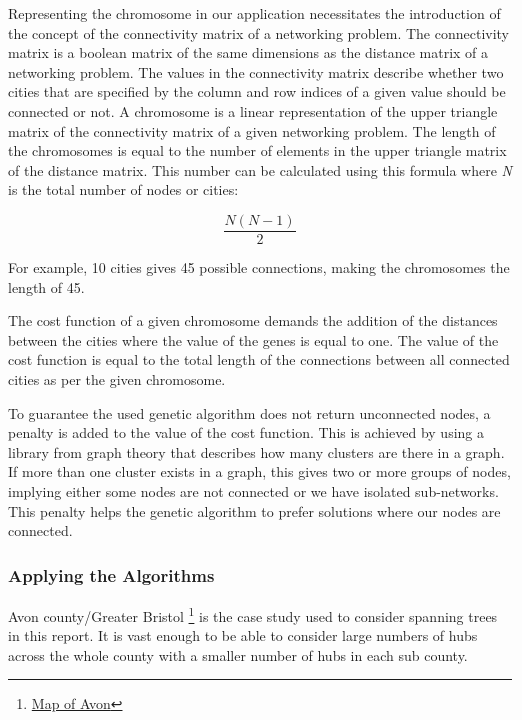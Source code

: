 \documentclass[twocolumn]{article}
\begin{document}
\par Representing the chromosome in our application necessitates the introduction of the concept of the connectivity matrix of a networking problem. The connectivity matrix is a boolean matrix of the same dimensions as the distance matrix of a networking problem.  The values in the connectivity matrix describe whether two cities that are specified by the column and row indices of a given value should be connected or not. A chromosome is a linear representation of the upper triangle matrix of the connectivity matrix of a given networking problem.  The length of the chromosomes is equal to the number of elements in the upper triangle matrix of the distance matrix. This number can be calculated using this formula where \textit{N} is the total number of nodes or cities:

\begin{equation}
\label{eq:number of elements}
 \frac {N(N - 1)}{2}
\end{equation}


\par For example, 10 cities gives 45 possible connections, making the chromosomes the length of 45. \par 

\par The cost function of a given chromosome demands the addition of the distances between the cities where the value of the genes is equal to one. The value of the cost function is equal to the total length of the connections between all connected cities as per the given chromosome.  \par

\par To guarantee the used genetic algorithm does not return unconnected nodes, a penalty is added to the value of the cost function. This is achieved by using a library from graph theory that describes how many clusters are there in a graph. If more than one cluster exists in a graph, this gives two or more groups of nodes, implying either some nodes are not connected or we have isolated sub-networks. This penalty helps the genetic algorithm to prefer solutions where our nodes are connected. \par


\subsubsection{Applying the Algorithms}
Avon county/Greater Bristol \footnote{\href{https://upload.wikimedia.org/wikipedia/commons/1/17/Greater_bristol_with_everything.png}{Map of Avon}} is the case study used to consider spanning trees in this report. It is vast enough to be able to consider large numbers of hubs across the whole county with a smaller number of hubs in each sub county.
\end{document}
